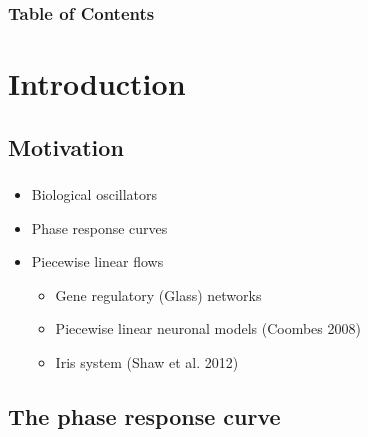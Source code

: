 \documentclass{beamer}
\begin{document}
\begin{frame}
\frametitle{Table of Contents}
\tableofcontents%
\end{frame}

\section{Introduction}
\subsection{Motivation}

\begin{frame}
  \frametitle{\insertsection}
  \framesubtitle{\insertsubsection}

  \begin{itemize}
  \item Biological oscillators
  \item Phase response curves
  \item Piecewise linear flows
  \begin{itemize}
  \item Gene regulatory (Glass) networks
  \item Piecewise linear neuronal models (Coombes 2008\cite{Coombes:2008:SIADS})
  \item Iris system (Shaw et al. 2012)%
  \end{itemize}
  \end{itemize}

\end{frame}
  
\subsection{The phase response curve}
\end{document}

